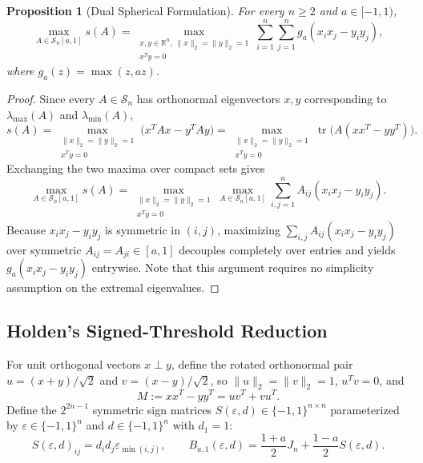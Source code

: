 \documentclass[11pt,reqno]{article}
\newtheorem{proposition}[theorem]{Proposition}
\theoremstyle{definition}
\newcommand{\R}{\mathbb{R}}
\newcommand{\tr}{\operatorname{tr}}
\begin{document}
\begin{proposition}[Dual Spherical Formulation]\label{prop:dual-sphere}
For every $n \ge 2$ and $a \in [-1, 1)$,
\begin{equation}\label{eq:dual-var}
\max_{A \in \mathcal{S}_n[a, 1]} s(A)
= \max_{\substack{x, y \in \R^n,\ \|x\|_2 = \|y\|_2 = 1 \\ x^T y = 0}} \sum_{i=1}^n \sum_{j=1}^n g_a(x_i x_j - y_i y_j),
\end{equation}
where $g_a(z) = \max(z, az)$.
\end{proposition}
\begin{proof}
Since every $A \in \mathcal{S}_n$ has orthonormal eigenvectors $x, y$ corresponding to $\lambda_{\max}(A)$ and $\lambda_{\min}(A)$,
\[
s(A) = \max_{\substack{\|x\|_2 = \|y\|_2 = 1 \\ x^T y = 0}} \bigl(x^T A x - y^T A y\bigr)
= \max_{\substack{\|x\|_2 = \|y\|_2 = 1 \\ x^T y = 0}} \tr\bigl(A(x x^T - y y^T)\bigr).
\]
Exchanging the two maxima over compact sets gives
\[
\max_{A \in \mathcal{S}_n[a, 1]} s(A)
= \max_{\substack{\|x\|_2 = \|y\|_2 = 1 \\ x^T y = 0}} \max_{A \in \mathcal{S}_n[a, 1]} \sum_{i,j=1}^n A_{ij}(x_i x_j - y_i y_j).
\]
Because $x_i x_j - y_i y_j$ is symmetric in $(i, j)$, maximizing $\sum_{i,j} A_{ij}(x_i x_j - y_i y_j)$ over symmetric $A_{ij} = A_{ji} \in [a, 1]$ decouples completely over entries and yields $g_a(x_i x_j - y_i y_j)$ entrywise. Note that this argument requires no simplicity assumption on the extremal eigenvalues.
\end{proof}

\subsection{Holden's Signed-Threshold Reduction}\label{sec:signed-threshold}

For unit orthogonal vectors $x \perp y$, define the rotated orthonormal pair $u = (x + y)/\sqrt{2}$ and $v = (x - y)/\sqrt{2}$, so $\|u\|_2 = \|v\|_2 = 1$, $u^T v = 0$, and
\begin{equation}\label{eq:M-factor}
M := x x^T - y y^T = u v^T + v u^T.
\end{equation}
Define the $2^{2n-1}$ symmetric sign matrices $S(\varepsilon, d) \in \{-1, 1\}^{n \times n}$ parameterized by $\varepsilon \in \{-1, 1\}^n$ and $d \in \{-1, 1\}^n$ with $d_1 = 1$:
\begin{equation}\label{eq:signed-threshold}
S(\varepsilon, d)_{ij} = d_i d_j \varepsilon_{\min(i, j)}, \qquad
B_{a, 1}(\varepsilon, d) = \frac{1+a}{2} J_n + \frac{1-a}{2} S(\varepsilon, d).
\end{equation}
\end{document}
